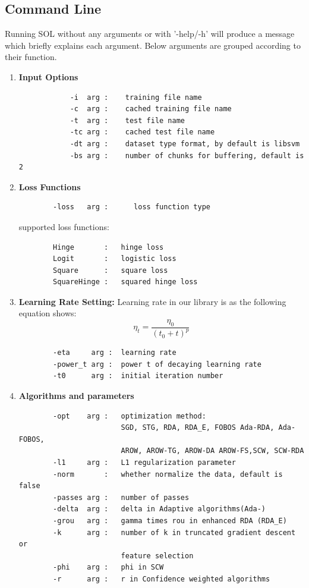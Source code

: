 \documentclass[11pt,a4paper]{article}
\newlength{\wideitemsep}
\let\olditem\item
\renewcommand{\item}{\setlength{\itemsep}{\wideitemsep}\olditem}
\begin{document}
\subsection{Command Line}
Running SOL without any arguments or with '-help/-h' will produce a message which briefly explains each argument. Below arguments are grouped according to their function.

\begin{enumerate}
    \item \textbf{Input Options}
        \begin{lstlisting}
            -i  arg :    training file name
            -c  arg :    cached training file name
            -t  arg :    test file name
            -tc arg :    cached test file name
            -dt arg :    dataset type format, by default is libsvm 
            -bs arg :    number of chunks for buffering, default is 2
        \end{lstlisting}

    \item \textbf{Loss Functions}
        \begin{lstlisting}
        -loss   arg :      loss function type
        \end{lstlisting}

        supported loss functions: 
        \begin{lstlisting}
        Hinge       :   hinge loss
        Logit       :   logistic loss
        Square      :   square loss
        SquareHinge :   squared hinge loss
        \end{lstlisting}

    \item \textbf{Learning Rate Setting:} Learning rate in our library is as the following equation shows:
        \begin{equation}
            \eta_t=\frac{\eta_0}{(t_0+t)^p}
            \label{equ:lrate}
        \end{equation}

        
        \begin{lstlisting}
        -eta     arg :  learning rate
        -power_t arg :  power t of decaying learning rate
        -t0      arg :  initial iteration number
        \end{lstlisting}

    \item \textbf{Algorithms and parameters}
        \begin{lstlisting}
        -opt    arg :   optimization method: 
                        SGD, STG, RDA, RDA_E, FOBOS Ada-RDA, Ada-FOBOS, 
                        AROW, AROW-TG, AROW-DA AROW-FS,SCW, SCW-RDA
        -l1     arg :   L1 regularization parameter
        -norm       :   whether normalize the data, default is false
        -passes arg :   number of passes 
        -delta  arg :   delta in Adaptive algorithms(Ada-)
        -grou   arg :   gamma times rou in enhanced RDA (RDA_E)
        -k      arg :   number of k in truncated gradient descent or 
                        feature selection
        -phi    arg :   phi in SCW
        -r      arg :   r in Confidence weighted algorithms
        \end{lstlisting}


\end{enumerate}
\end{document}
